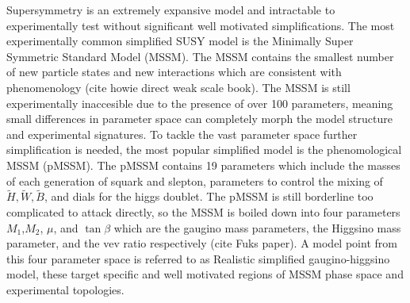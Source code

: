 


Supersymmetry is an extremely expansive model and intractable to experimentally test without significant well motivated simplifications. The most experimentally common simplified SUSY model is the Minimally Super Symmetric Standard Model (MSSM). The MSSM contains the smallest number of new particle states and new interactions which are consistent with phenomenology (cite howie direct weak scale book). The MSSM is still experimentally inaccesible due to the presence of over 100 parameters, meaning small differences in parameter space can completely morph the model structure and experimental signatures. To tackle the vast parameter space further simplification is needed, the most popular simplified model is the phenomological MSSM (pMSSM). The pMSSM contains 19 parameters which include the masses of each generation of squark and slepton, parameters to control the mixing of $\tilde{H}, \tilde{W}, \tilde{B}$, and dials for the higgs doublet.  The pMSSM is still borderline too complicated to attack directly, so the MSSM is boiled down into four parameters $M_1$,$M_2$, $\mu$, and $\tan\beta$ which are the gaugino mass parameters, the Higgsino mass parameter, and the vev ratio respectively (cite Fuks paper).  A model point from this four parameter space is referred to as Realistic simplified gaugino-higgsino model, these target specific and well motivated regions of MSSM phase space and experimental topologies.

